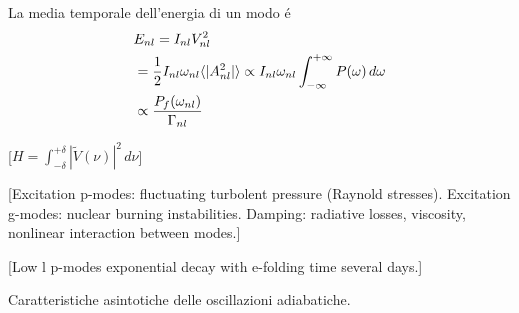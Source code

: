 \documentclass[../main.tex]{subfiles}
\begin{document}
La media temporale dell'energia di un modo \'e
\begin{align}
&E_{nl}=I_{nl}V_{nl}^2\\
&=\frac{1}{2}I_{nl}\omega_{nl}\langle |A_{nl}^2| \rangle\propto I_{nl}\omega_{nl}\int_{-\infty}^{+\infty}{}P(\omega)\,d\omega\\
&\propto\frac{P_f(\omega_{nl})}{\Gamma_{nl}}
\end{align}

[$H=\int_{-\delta}^{+\delta}|\tilde{V}(\nu)|^2\,d\nu$]

\begin{comment}%
[Si ipotizza che le oscillazioni siano eccitate in maniera stocastica dai moti convettivi: la larghezza delle frequenze risonanti \'e determinata dal tempo di smorzamento.]

[Extensive turbolent layers: stars lose all hint of vibrational instability]

[Not self excited: driven to observable amplitude by external process]

[Turbolent convection: source of pulsational energy, emit acustic radiation]

[Stable pulsation: spectrum as that of an ensemble of harmonic oscillator stocastically driven and damped]

[Power spectrum indipendent of l for $l<100$: low degree modes are not influenced by $k_h$. Vertical propagation: superficial layers (low l modes are generated in these strata)]


[Interaction with turbolent convection]

[Radiative transfer (as frequencies rise modes became more sensitive to rapid relaxation time in solar atmosphere)]

[La stabilit\'a dei modi g \'e determinata dalla stabilit\'a convettiva: se non sono presenti regioni di instabilit\'a convettiva i modi g sono stabili ($g_+$), se esistono zone convettivamente instabili esistono anche modi g instabili ($g_{\,-}$).]
\end{comment}

[Excitation p-modes: fluctuating turbolent pressure (Raynold stresses). Excitation g-modes: nuclear burning instabilities. Damping: radiative losses, viscosity, nonlinear interaction between modes.]

[Low l p-modes exponential decay with e-folding time several days.]



{\let\clearpage\relax\let\cleardoublepagerelax           %
\chapter{Caratteristiche asintotiche delle oscillazioni adiabatiche.}\label{chap:asyntoticbehavour}
}
\end{document}
